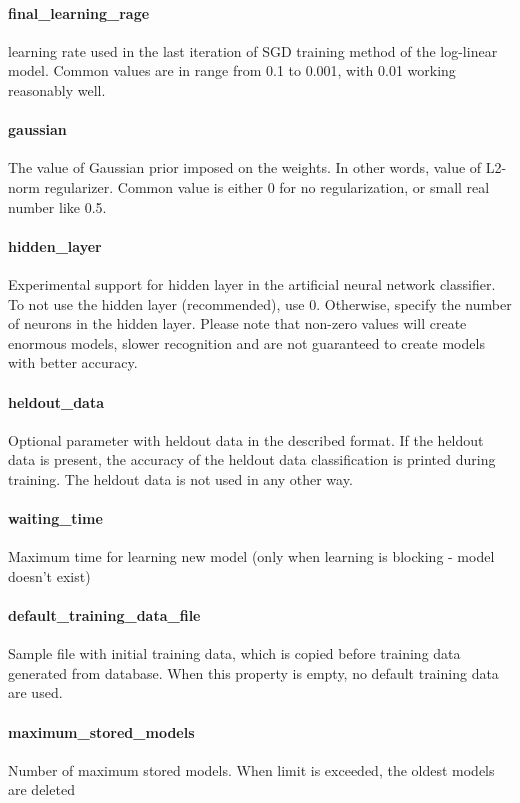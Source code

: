 \documentclass[12pt,a4paper]{report}
\begin{document}
\paragraph{final\_learning\_rage}
learning rate used in the last iteration of SGD training method of the log-linear model. Common values are in range from 0.1 to 0.001, with 0.01 working reasonably well.

\paragraph{gaussian}
The value of Gaussian prior imposed on the weights. In other words, value of L2-norm regularizer. Common value is either 0 for no regularization, or small real number like 0.5.

\paragraph{hidden\_layer}
Experimental support for hidden layer in the artificial neural network classifier. To not use the hidden layer (recommended), use 0. Otherwise, specify the number of neurons in the hidden layer. Please note that non-zero values will create enormous models, slower recognition and are not guaranteed to create models with better accuracy.

\paragraph{heldout\_data}
Optional parameter with heldout data in the described format. If the heldout data is present, the accuracy of the heldout data classification is printed during training. The heldout data is not used in any other way.

\paragraph{waiting\_time}
Maximum time for learning new model (only when learning is blocking - model doesn't exist)

\paragraph{default\_training\_data\_file}
Sample file with initial training data, which is copied before training data generated from database. When this property is empty, no default training data are used.

\paragraph{maximum\_stored\_models}
Number of maximum stored models. When limit is exceeded, the oldest models are deleted
\end{document}
